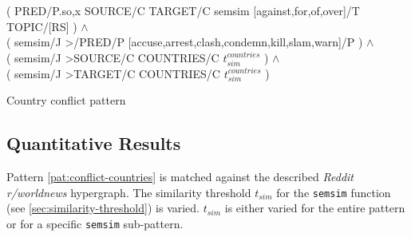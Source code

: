 \documentclass[11pt]{scrreprt}
\begin{document}
\begin{pattern}
  \normalfont\sffamily
  \centering
  ( PRED/P.{so,x} SOURCE/C TARGET/C semsim [against,for,of,over]/T TOPIC/[RS] ) \(\wedge\) \\ 
  ( semsim/J >/PRED/P [accuse,arrest,clash,condemn,kill,slam,warn]/P ) \(\wedge\) \\
  ( semsim/J >SOURCE/C COUNTRIES/C \(t_{sim}^{countries}\) ) \(\wedge\) \\ 
  ( semsim/J >TARGET/C COUNTRIES/C \(t_{sim}^{countries}\) )
  \caption{Country conflict pattern}
  \label{pat:conflict-countries-threshold-countries}
\end{pattern}


\subsection{Quantitative Results}



Pattern \ref{pat:conflict-countries} is matched against the described \textit{Reddit r/worldnews} hypergraph. The similarity threshold  \(t_{sim}\) for the \texttt{semsim} function (see \ref{sec:similarity-threshold}) is varied. \(t_{sim}\) is either varied for the entire pattern or for a specific \texttt{semsim} sub-pattern. 


\end{document}
